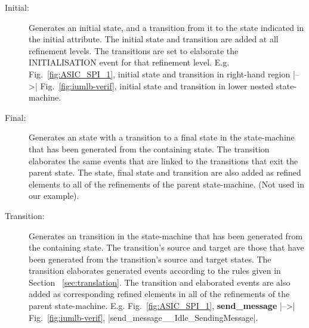 \begin{description}
\item[Initial:] Generates an \UMLB initial state, and a transition from it to the \UMLB state indicated in the \SCXML initial attribute. 
The \UMLB initial state and \UMLB transition are added at all refinement levels. The \UMLB transitions are set to elaborate the \EventB INITIALISATION event for that refinement level.
E.g. Fig.~\ref{fig:ASIC_SPI_1}, initial state and transition in right-hand region |-->| Fig.~\ref{fig:iumlb-verif}, initial state and transition in lower nested state-machine.

\item[Final:] Generates an \UMLB state with a transition to a final state in the state-machine that has been generated from the containing \SCXML state. 
The transition elaborates the same events that are linked to the transitions that exit the parent \UMLB state. 
The \UMLB state, final state and transition are also added as refined elements to all of the refinements of the parent \UMLB state-machine.
(Not used in our example).

\item[Transition:] Generates an \UMLB transition in the state-machine that has been generated from the containing \SCXML state. 
The \UMLB transition’s source and target are those that have been generated from the \SCXML transition’s source and target states. 
The transition elaborates generated \EVENTB events according to the rules given in Section ~\ref{sec:translation}. 
The \UMLB transition and elaborated \EVENTB events are also added as corresponding refined elements in all of the refinements of the parent \UMLB state-machine.
E.g. Fig.~\ref{fig:ASIC_SPI_1}, \textbf{send\_message} |-->| Fig.~\ref{fig:iumlb-verif}, |send_message__Idle_SendingMessage|.


\end{description}



